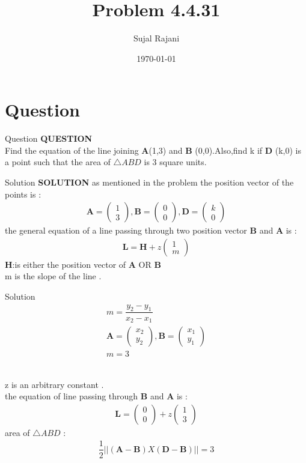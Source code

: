\documentclass{beamer}
\title{Problem 4.4.31}
\author{Sujal Rajani}
\date{\today}
\let\vec\mathbf
\theoremstyle{remark}
\newcommand{\myvec}[1]{\ensuremath{\begin{pmatrix}#1\end{pmatrix}}}
\numberwithin{equation}{section}
\begin{document}
\begin{frame}
\titlepage
\end{frame}

\section{Question}
\begin{frame}{Question}
\textbf{QUESTION}
\\
Find the equation of the line joining $\vec{A}$(1,3) and $\vec{B}$ (0,0).Also,find k if $\vec{D}$ (k,0) is a point such that the area of $\triangle ABD$ is 3 square units.
\end{frame}
\begin{frame}{Solution}
\textbf{SOLUTION}
as mentioned in the problem the position vector of the points is :
\\
\begin{align*}
    \vec{A}=\myvec{1\\3},\vec{B}=\myvec{0\\0},\vec{D}=\myvec{k\\0}
\end{align*}
the general equation of a line passing through two position vector $\vec{B}$ and $\vec{A}$ is :
\begin{align*}
    \vec{L}=\vec{H}+z\myvec{1\\m}
\end{align*}
$\vec{H}$:is either the position vector of $\vec{A}$ OR $\vec{B}$
\\
m is the slope of the line .

 \end{frame}
\begin{frame}{Solution}
\begin{align*}
    m=\dfrac{y_2-y_1}{x_2-x_1}
    \\
    \vec{A}=\myvec{x_2\\y_2},\vec{B}=\myvec{x_1\\y_1}
    \\
    m=3
\end{align*}

\\
z is an arbitrary constant .
\\
the equation of line passing through  $\vec{B}$ and $\vec{A}$ is :
\\
\begin{align*}
    \vec{L}=\myvec{0\\0}+z\myvec{1\\3}
\end{align*}
area of $\triangle ABD $ : 
\\
\begin{align*}
    \dfrac{1}{2}||(\vec{A}- \vec{B})X(\vec{D}- \vec{B})||=3
\end{align*}
     \end{frame}
\end{document}
